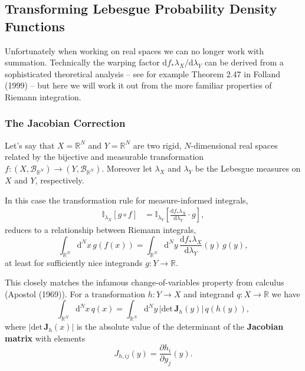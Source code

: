 \documentclass[
  letterpaper,
  DIV=11,
  numbers=noendperiod]{scrartcl}
\begin{document}
\hypertarget{transforming-lebesgue-probability-density-functions}{%
\subsection{Transforming Lebesgue Probability Density
Functions}\label{transforming-lebesgue-probability-density-functions}}

Unfortunately when working on real spaces we can no longer work with
summation. Technically the warping factor
\(\mathrm{d} f_{*} \lambda_{X} / \mathrm{d} \lambda_{Y}\) can be derived
from a sophisticated theoretical analysis -- see for example Theorem
2.47 in Folland (1999) -- but here we will work it out from the more
familiar properties of Riemann integration.

\hypertarget{the-jacobian-correction}{%
\subsubsection{The Jacobian Correction}\label{the-jacobian-correction}}

Let's say that \(X = \mathbb{R}^{N}\) and \(Y = \mathbb{R}^{N}\) are two
rigid, \(N\)-dimensional real spaces related by the bijective and
measurable transformation
\(f : (X, \mathcal{B}_{\mathbb{R}^{N}}) \rightarrow  (Y, \mathcal{B}_{\mathbb{R}^{N}})\).
Moreover let \(\lambda_{X}\) and \(\lambda_{Y}\) be the Lebesgue
measures on \(X\) and \(Y\), respectively.

In this case the transformation rule for measure-informed integrals,
\begin{align*}
\mathbb{I}_{\lambda_{X}} [ g \circ f ]
&=
\mathbb{I}_{\lambda_{Y}} \left[
\frac{ \mathrm{d} f_{*} \lambda_{X} }{ \mathrm{d} \lambda_{Y}} \cdot g
\right],
\end{align*} reduces to a relationship between Riemann integrals, \[
\int_{\mathbb{R}^{N}} \mathrm{d}^{N} x \, g(f(x))
=
\int_{\mathbb{R}^{N}} \mathrm{d}^{N} y \,
\frac{ \mathrm{d} f_{*} \lambda_{X} }{ \mathrm{d} \lambda_{Y}}(y) \,
g(y),
\] at least for sufficiently nice integrands
\(g : Y \rightarrow \mathbb{R}\).

This closely matches the infamous change-of-variables property from
calculus (Apostol (1969)). For a transformation \(h : Y \rightarrow X\)
and integrand \(q : X \rightarrow \mathbb{R}\) we have \[
\int_{\mathbb{R}^{N}} \mathrm{d}^{N} x \, q(x)
=
\int_{\mathbb{R}^{N}} \mathrm{d}^{N} y \,
| \mathrm{det} \,  \mathbf{J}_{h}(y) | \, q(h(y)),
\] where \(| \mathrm{det} \, \mathbf{J}_{h}(x) |\) is the absolute value
of the determinant of the \textbf{Jacobian matrix} with elements \[
J_{h, ij}(y) = \frac{ \partial h_{i} }{ \partial y_{j} } (y).
\]
\end{document}
